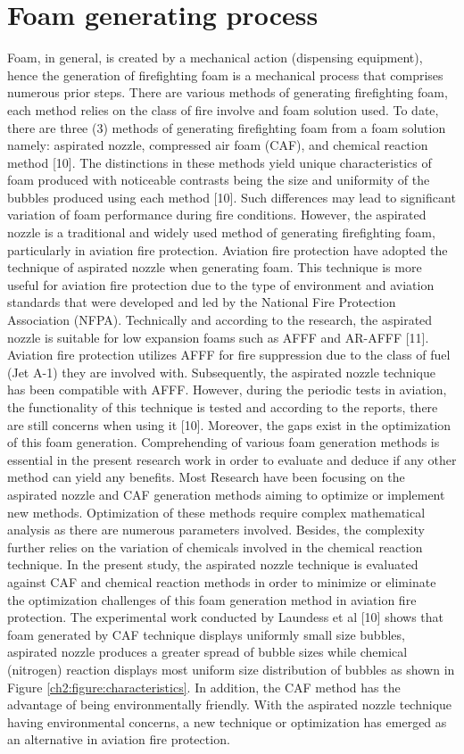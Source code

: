 \documentclass[12pt]{report}
\begin{document}
\section{Foam generating process}
Foam, in general, is created by a mechanical action (dispensing equipment), hence the generation of firefighting foam is a mechanical process that comprises numerous prior steps. There are various methods of generating firefighting foam, each method relies on the class of fire involve and foam solution used. To date, there are three (3) methods of generating firefighting foam from a foam solution namely: aspirated nozzle, compressed air foam (CAF), and chemical reaction method [10]. The distinctions in these methods yield unique characteristics of foam produced with noticeable contrasts being the size and uniformity of the bubbles produced using each method [10]. Such differences may lead to significant variation of foam performance during fire conditions. However, the aspirated nozzle is a traditional and widely used method of generating firefighting foam, particularly in aviation fire protection.
Aviation fire protection have adopted the technique of aspirated nozzle when generating foam. This technique is more useful for aviation fire protection due to the type of environment and aviation standards that were developed and led by the National Fire Protection Association (NFPA). Technically and according to the research, the aspirated nozzle is suitable for low expansion foams such as AFFF and AR-AFFF [11].  Aviation fire protection utilizes AFFF for fire suppression due to the class of fuel (Jet A-1) they are involved with. Subsequently, the aspirated nozzle technique has been compatible with AFFF. However, during the periodic tests in aviation, the functionality of this technique is tested and according to the reports, there are still concerns when using it [10]. Moreover, the gaps exist in the optimization of this foam generation.
Comprehending of various foam generation methods is essential in the present research work in order to evaluate and deduce if any other method can yield any benefits. Most Research have been focusing on the aspirated nozzle and CAF generation methods aiming to optimize or implement new methods. Optimization of these methods require complex mathematical analysis as there are numerous parameters involved. Besides, the complexity further relies on the variation of chemicals involved in the chemical reaction technique.
In the present study, the aspirated nozzle technique is evaluated against CAF and chemical reaction methods in order to minimize or eliminate the optimization challenges of this foam generation method in aviation fire protection. The experimental work conducted by Laundess et al [10] shows that foam generated by CAF technique displays uniformly small size bubbles, aspirated nozzle produces a greater spread of bubble sizes while chemical (nitrogen) reaction displays most uniform size distribution of bubbles as shown in Figure \ref{ch2:figure:characteristics}. In addition, the CAF method has the advantage of being environmentally friendly.  With the aspirated nozzle technique having environmental concerns, a new technique or optimization has emerged as an alternative in aviation fire protection.
\end{document}

